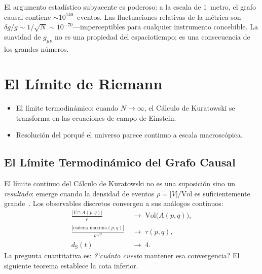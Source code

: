 \documentclass[11pt, a4paper, openany]{book}
\newcommand{\dS}{d_{\mathrm{S}}}
\newenvironment{introduction}[1][Sinopsis del M\'odulo]{%
  \begin{tcolorbox}[
    enhanced,colback=structure!5,colframe=structure,
    colbacktitle=structure,coltitle=white,
    fonttitle=\small\bfseries,title={#1},
    arc=2pt,boxrule=0.7pt,
    left=8pt,right=8pt,top=6pt,bottom=6pt,
    before skip=12pt,after skip=12pt
  ]\itshape\begin{itemize}[leftmargin=*,itemsep=2pt,parsep=0pt]
}{%
  \end{itemize}\end{tcolorbox}
}
\begin{document}
\noindent
El argumento estad\'istico subyacente es poderoso: a la escala de
$1$~metro, el grafo causal contiene $\sim 10^{140}$~eventos. Las
fluctuaciones relativas de la m\'etrica son
$\delta g / g \sim 1/\sqrt{N} \sim 10^{-70}$---imperceptibles para
cualquier instrumento concebible. La suavidad de $g_{\mu\nu}$ no es
una propiedad del espaciotiempo; es una consecuencia de los grandes
n\'umeros.

\chapter{El L\'imite de Riemann}
%

\begin{introduction}
  \item El l\'imite termodin\'amico: cuando $N \to \infty$, el C\'alculo
        de Kuratowski se transforma en las ecuaciones de campo de Einstein.
  \item Resoluci\'on del porqu\'e el universo parece continuo a escala
        macrosc\'opica.
\end{introduction}

\section{El L\'imite Termodin\'amico del Grafo Causal}

El l\'imite continuo del C\'alculo de Kuratowski no es una
suposici\'on sino un \emph{resultado}: emerge cuando la densidad de
eventos $\rho = |V|/\mathrm{Vol}$ es suficientemente
grande~\cite{bombelli1987,surya2019,major2007}. Los observables
discretos convergen a sus an\'alogos continuos:
%
\begin{align}
  \frac{|V \cap A(p,q)|}{\rho} &\;\longrightarrow\; \mathrm{Vol}\bigl(A(p,q)\bigr),
  \label{eq:vol-limit}\\[4pt]
  \frac{|\text{cadena m\'axima}(p,q)|}{\rho^{1/d}}
  &\;\longrightarrow\; \tau(p,q),
  \label{eq:tau-limit}\\[4pt]
  \dS(t) &\;\longrightarrow\; 4.
  \label{eq:ds-limit}
\end{align}
%
La pregunta cuantitativa es: \textit{?`cu\'anto cuesta} mantener esa
convergencia? El siguiente teorema establece la cota inferior.
\end{document}
